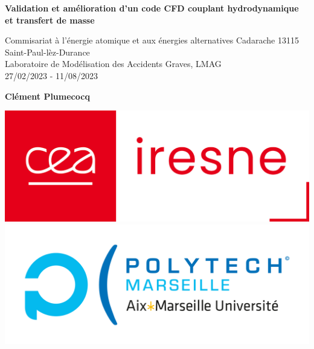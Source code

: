 \documentclass[a4paper,11pt,fleqn]{report}    %
\begin{document}

\hypersetup{pageanchor=false}
\begin{titlepage}
    \begin{center}
        \vspace*{1cm}

        \Huge
        \textbf{Validation et amélioration d'un code CFD couplant hydrodynamique et transfert de masse}

        \vspace{0.5cm}
        \LARGE
        Commisariat à l'énergie atomique et aux énergies alternatives Cadarache 13115 Saint-Paul-lèz-Durance\\
        Laboratoire de Modélisation des Accidents Graves, LMAG\\
        27/02/2023 - 11/08/2023
        \vspace{1.5cm}

        \textbf{Clément Plumecocq}

        \vfill

        \includegraphics[scale=0.15]{logo_iresne.png}\includegraphics[scale=0.20]{polytech.jpg}

        \vfill

        \Large
        \noindent{}
    \end{center}
\end{titlepage}
\end{document}
